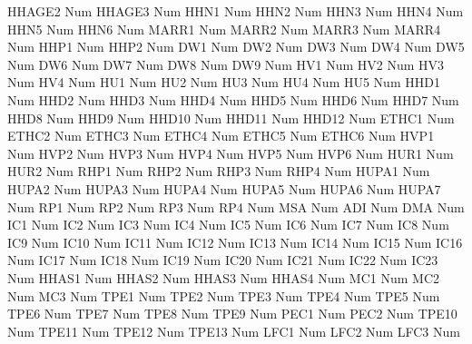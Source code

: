 \documentclass[
  11pt,
  a4paper,
  DIV=12,captions=tableheading,oneside,titlepage]{scrbook}
\let\oldverbatim\verbatim
\let\endoldverbatim\endverbatim
\renewenvironment{verbatim}{\footnotesize\oldverbatim}{\endoldverbatim}
\begin{document}
\begin{verbatim}
  HHAGE2      Num   
  HHAGE3      Num   
  HHN1        Num   
  HHN2        Num   
  HHN3        Num   
  HHN4        Num   
  HHN5        Num   
  HHN6        Num   
  MARR1       Num   
  MARR2       Num   
  MARR3       Num   
  MARR4       Num   
  HHP1        Num   
  HHP2        Num   
  DW1         Num   
  DW2         Num   
  DW3         Num   
  DW4         Num   
  DW5         Num   
  DW6         Num   
  DW7         Num   
  DW8         Num   
  DW9         Num   
  HV1         Num   
  HV2         Num   
  HV3         Num   
  HV4         Num   
  HU1         Num   
  HU2         Num   
  HU3         Num   
  HU4         Num   
  HU5         Num   
  HHD1        Num   
  HHD2        Num   
  HHD3        Num   
  HHD4        Num   
  HHD5        Num   
  HHD6        Num   
  HHD7        Num   
  HHD8        Num   
  HHD9        Num   
  HHD10       Num   
  HHD11       Num   
  HHD12       Num   
  ETHC1       Num   
  ETHC2       Num   
  ETHC3       Num   
  ETHC4       Num   
  ETHC5       Num   
  ETHC6       Num   
  HVP1        Num   
  HVP2        Num   
  HVP3        Num   
  HVP4        Num   
  HVP5        Num   
  HVP6        Num   
  HUR1        Num   
  HUR2        Num   
  RHP1        Num   
  RHP2        Num   
  RHP3        Num   
  RHP4        Num   
  HUPA1       Num   
  HUPA2       Num   
  HUPA3       Num   
  HUPA4       Num   
  HUPA5       Num   
  HUPA6       Num   
  HUPA7       Num   
  RP1         Num   
  RP2         Num   
  RP3         Num   
  RP4         Num   
  MSA         Num   
  ADI         Num   
  DMA         Num   
  IC1         Num   
  IC2         Num   
  IC3         Num   
  IC4         Num   
  IC5         Num   
  IC6         Num   
  IC7         Num   
  IC8         Num   
  IC9         Num   
  IC10        Num   
  IC11        Num   
  IC12        Num   
  IC13        Num   
  IC14        Num   
  IC15        Num   
  IC16        Num   
  IC17        Num   
  IC18        Num   
  IC19        Num   
  IC20        Num   
  IC21        Num   
  IC22        Num   
  IC23        Num   
  HHAS1       Num   
  HHAS2       Num   
  HHAS3       Num   
  HHAS4       Num   
  MC1         Num   
  MC2         Num   
  MC3         Num   
  TPE1        Num   
  TPE2        Num   
  TPE3        Num   
  TPE4        Num   
  TPE5        Num   
  TPE6        Num   
  TPE7        Num   
  TPE8        Num   
  TPE9        Num   
  PEC1        Num   
  PEC2        Num   
  TPE10       Num   
  TPE11       Num   
  TPE12       Num   
  TPE13       Num   
  LFC1        Num   
  LFC2        Num   
  LFC3        Num   

\end{verbatim}
\end{document}
